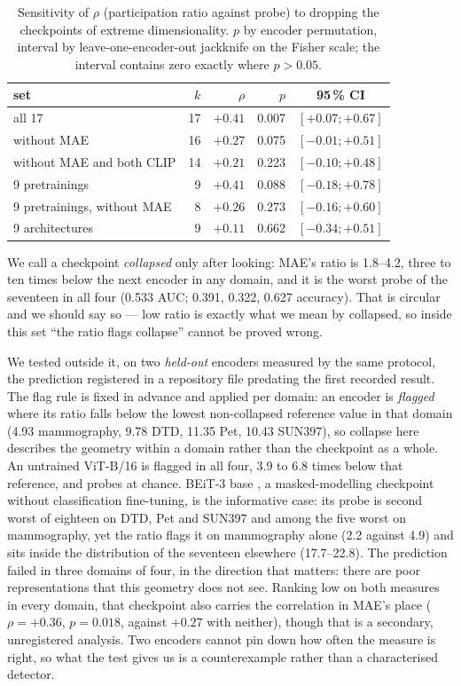 \documentclass{esannV2}
\begin{document}
\begin{table}[t]
\centering\small
\setlength{\tabcolsep}{4pt}
\begin{tabular}{@{}lrrrc@{}}
\toprule
set & $k$ & $\rho$ & $p$ & 95\,\% CI \\
\midrule
all 17 & 17 & $+0.41$ & 0.007 & $[+0.07; +0.67]$ \\
without MAE & 16 & $+0.27$ & 0.075 & $[-0.01; +0.51]$ \\
without MAE and both CLIP & 14 & $+0.21$ & 0.223 & $[-0.10; +0.48]$ \\
\midrule
9 pretrainings & 9 & $+0.41$ & 0.088 & $[-0.18; +0.78]$ \\
9 pretrainings, without MAE & 8 & $+0.26$ & 0.273 & $[-0.16; +0.60]$ \\
9 architectures & 9 & $+0.11$ & 0.662 & $[-0.34; +0.51]$ \\
\bottomrule
\end{tabular}
\caption{Sensitivity of $\rho$ (participation ratio against probe) to dropping
the checkpoints of extreme dimensionality. $p$ by encoder permutation, interval
by leave-one-encoder-out jackknife on the Fisher scale; the interval contains
zero exactly where $p > 0.05$.}
\label{tab:sens}
\end{table}

We call a checkpoint \emph{collapsed} only after looking: MAE's ratio is
1.8--4.2, three to ten times below the next encoder in any domain, and it is
the worst probe of the seventeen in all four (0.533 AUC; 0.391, 0.322, 0.627
accuracy). That is circular and we should say so --- low ratio is exactly what
we mean by collapsed, so inside this set ``the ratio flags collapse'' cannot be
proved wrong.

We tested outside it, on two \emph{held-out} encoders measured by the same
protocol, the prediction registered in a repository file predating the first
recorded result. The flag rule is fixed in advance and applied per domain: an
encoder is \emph{flagged} where its ratio falls below the lowest non-collapsed
reference value in that domain (4.93 mammography, 9.78 DTD, 11.35 Pet, 10.43
SUN397), so collapse here describes the geometry within a domain rather than
the checkpoint as a whole. An untrained ViT-B/16 is flagged in all four, 3.9 to
6.8 times below that reference, and probes at chance. BEiT-3 base \cite{BEiT3}, a
masked-modelling checkpoint without classification fine-tuning, is the
informative case: its probe is second worst of eighteen on DTD, Pet and SUN397
and among the five worst on mammography, yet the ratio flags it on mammography
alone (2.2 against 4.9) and sits inside the distribution of the seventeen
elsewhere (17.7--22.8). The prediction failed in three domains of four, in the
direction that matters: there are poor representations that this geometry does
not see. Ranking low on both measures in every domain, that checkpoint
also carries the correlation in MAE's place ($\rho = +0.36$, $p = 0.018$,
against $+0.27$ with neither), though that is a secondary, unregistered
analysis.
Two encoders cannot pin down how often the measure is right, so what the test
gives us is a counterexample rather than a characterised detector.
\end{document}
